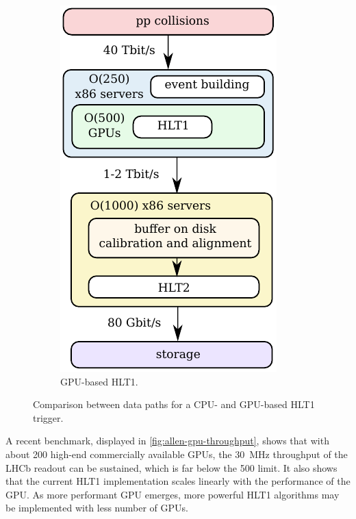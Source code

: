 \begin{figure}[!htb]
\begin{subfigure}[t]{0.36\textwidth}
        \includegraphics[width=\textwidth]{./figs-lhcb-upgrade-overview/trigger/data_path_gpu.pdf}
        \caption{GPU-based HLT1.}
    \end{subfigure}

    \caption{
        Comparison between data paths for a CPU- and GPU-based HLT1 trigger.
    }
    \label{fig:cpu-vs-gpu-hlt1}
\end{figure}

A recent benchmark, displayed in \cref{fig:allen-gpu-throughput},
shows that with about 200 high-end commercially available GPUs, the
30~MHz throughput of the LHCb readout can be sustained,
which is far below the 500 limit.
It also shows that the current HLT1 implementation scales linearly with
the performance of the GPU.
As more performant GPU emerges, more powerful HLT1 algorithms may be implemented
with less number of GPUs.


